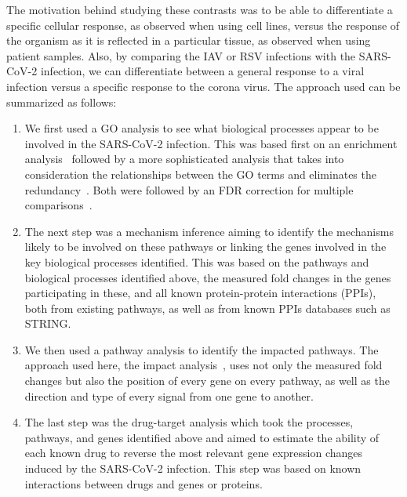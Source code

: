 \documentclass[Minh_PhD_thesis.tex]{subfiles}
\begin{document}
The motivation behind studying these contrasts was to be able to differentiate a specific cellular response, as  observed when using cell lines, versus the response of the organism as it is reflected in a particular tissue, as observed when using  patient samples. Also, by comparing the IAV or RSV infections with the SARS-CoV-2 infection, we can differentiate between a general response to a viral infection versus a specific response to the  corona virus. 
The approach used can be summarized as follows: 
\begin{enumerate}
\item We first used a GO analysis to see what biological processes appear to be involved in the SARS-CoV-2 infection. This was based first on an enrichment analysis~\cite{Tavazoie:1999,DraghiciOE2:2003} followed by a more sophisticated analysis that takes into consideration the relationships between the GO terms and eliminates the redundancy~\cite{Alexa:2006}. Both were followed by an FDR correction for multiple comparisons~\cite{Benjamini:1995,Benjamini:2001}. 
\item The next step was a mechanism inference  aiming to identify the mechanisms likely to be involved on these pathways or linking the genes involved in the key biological processes identified. This was based on the pathways and biological processes identified above, the measured fold changes in the genes participating in these, and all known protein-protein interactions (PPIs), both from existing pathways, as well as from known PPIs databases such as STRING.

\item We then  used a pathway analysis to identify the impacted pathways. The approach used here, the impact analysis~\cite{DraghiciPE:2007,TarcaSPIA:2009}, uses not only the measured fold changes but also the position of every gene on every pathway, as well as the direction and type of every signal from one gene to another. 
\item The last step was the drug-target analysis which took the processes, pathways, and genes identified above and  aimed to estimate the ability of each known drug to reverse the most relevant gene expression changes induced by the SARS-CoV-2 infection. This step was based on known interactions between drugs and genes or proteins. 
\end{enumerate}
\end{document}
